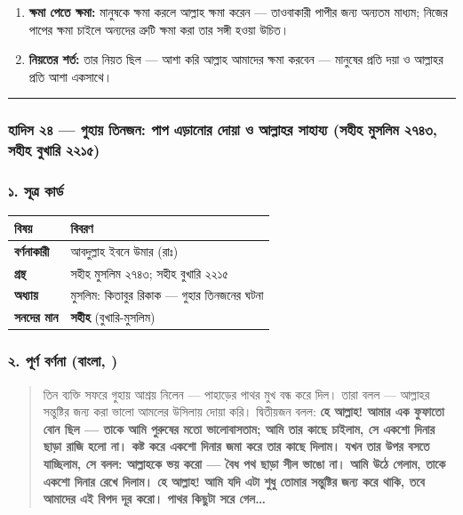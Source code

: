 \begin{enumerate}
\item \textbf{ক্ষমা পেতে ক্ষমা:} মানুষকে ক্ষমা করলে আল্লাহ ক্ষমা করেন — তাওবাকারী পাপীর জন্য অন্যতম মাধ্যম; নিজের পাপের ক্ষমা চাইলে অন্যদের ত্রুটি ক্ষমা করা তার সঙ্গী হওয়া উচিত।
\item \textbf{নিয়তের শর্ত:} তার নিয়ত ছিল — আশা করি আল্লাহ আমাদের ক্ষমা করবেন — মানুষের প্রতি দয়া ও আল্লাহর প্রতি আশা একসাথে।
\end{enumerate}
\medskip\hrule\medskip

\subsubsection*{হাদিস ২৪ — গুহায় তিনজন: পাপ এড়ানোর দোয়া ও আল্লাহর সাহায্য (সহীহ মুসলিম ২৭৪৩, সহীহ বুখারি ২২১৫)}

\subsubsection*{১. সূত্র কার্ড}

\begin{table}[h]\centering\small
\begin{tabular}{ll}
বিষয় & বিবরণ \\
\hline
\textbf{বর্ণনাকারী} & আবদুল্লাহ ইবনে উমার (রাঃ) \\
\textbf{গ্রন্থ} & সহীহ মুসলিম ২৭৪৩; সহীহ বুখারি ২২১৫ \\
\textbf{অধ্যায়} & মুসলিম: কিতাবুর রিকাক — গুহার তিনজনের ঘটনা \\
\textbf{সনদের মান} & \textbf{সহীহ} (বুখারি-মুসলিম) \\
\hline
\end{tabular}
\end{table}

\subsubsection*{২. পূর্ণ বর্ণনা (বাংলা, )}

\begin{quote}
তিন ব্যক্তি সফরে গুহায় আশ্রয় নিলেন — পাহাড়ের পাথর মুখ বন্ধ করে দিল। তারা বলল — আল্লাহর সন্তুষ্টির জন্য করা ভালো আমলের উসিলায় দোয়া করি। দ্বিতীয়জন বলল: \textbf{হে আল্লাহ! আমার এক ফুফাতো বোন ছিল — তাকে আমি পুরুষের মতো ভালোবাসতাম; আমি তার কাছে চাইলাম, সে একশো দিনার ছাড়া রাজি হলো না। কষ্ট করে একশো দিনার জমা করে তার কাছে দিলাম। যখন তার উপর বসতে যাচ্ছিলাম, সে বলল: আল্লাহকে ভয় করো — বৈধ পথ ছাড়া সীল ভাঙো না। আমি উঠে গেলাম, তাকে একশো দিনার রেখে দিলাম। হে আল্লাহ! আমি যদি এটা শুধু তোমার সন্তুষ্টির জন্য করে থাকি, তবে আমাদের এই বিপদ দূর করো। পাথর কিছুটা সরে গেল…}
\end{quote}

